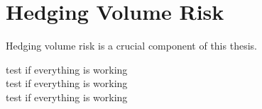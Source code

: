 

%

\chapter{Hedging Volume Risk}
\label{ch:Hedging_Volume_Risk}

    Hedging volume risk is a crucial component of this thesis.

    test if everything is working \\
    test if everything is working \\
    test if everything is working












